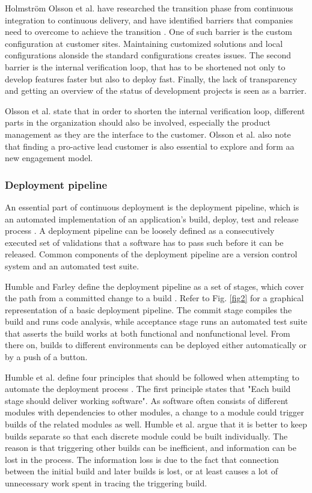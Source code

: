 \documentclass[english]{tktltiki2}
\theoremstyle{definition}
\theoremstyle{remark}
\begin{document}
Holmström Olsson et al. have researched the transition phase from continuous integration to continuous delivery, and have identified barriers that companies need to overcome to achieve the transition \cite{olsson2012climbing}. One of such barrier is the custom configuration at customer sites. Maintaining customized solutions and local configurations alonside the standard configurations creates issues. The second barrier is the internal verification loop, that has to be shortened not only to develop features faster but also to deploy fast. Finally, the lack of transparency and getting an overview of the status of development projects is seen as a barrier.

Olsson et al. state that in order to shorten the internal verification loop, different parts in the organization should also be involved, especially the product management as they are the interface to the customer. Olsson et al. also note that finding a pro-active lead customer is also essential to explore and form aa new engagement model.

\subsubsection{Deployment pipeline}
An essential part of continuous deployment is the deployment pipeline, which is an automated implementation of an application's build, deploy, test and release process \cite{cdbook}. A deployment pipeline can be loosely defined as a consecutively executed set of validations that a software has to pass such before it can be released. Common components of the deployment pipeline are a version control system and an automated test suite.

Humble and Farley define the deployment pipeline as a set of stages, which cover the path from a committed change to a build \cite{cdbook}. Refer to Fig. \ref{fig2} for a graphical representation of a basic deployment pipeline. The commit stage compiles the build and runs code analysis, while acceptance stage runs an automated test suite that asserts the build works at both functional and nonfunctional level. From there on, builds to different environments can be deployed either automatically or by a push of a button.

Humble et al. define four principles that should be followed when attempting to automate the deployment process \cite{humble2006deployment}. The first principle states that "Each build stage should deliver working software". As software often consists of different modules with dependencies to other modules, a change to a module could trigger builds of the related modules as well. Humble et al. argue that it is better to keep builds separate so that each discrete module could be built individually. The reason is that triggering other builds can be inefficient, and information can be lost in the process. The information loss is due to the fact that connection between the initial build and later builds is lost, or at least causes a lot of unnecessary work spent in tracing the triggering build. 
\end{document}
